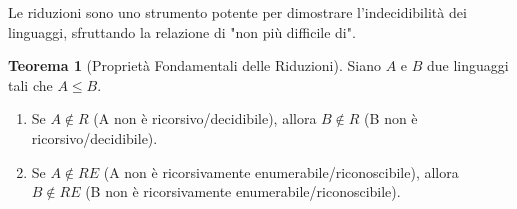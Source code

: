\documentclass[a4paper]{article}
\theoremstyle{definition} %
\newtheorem{theorem}{Teorema}
[section] %
\begin{document}
Le riduzioni sono uno strumento potente per dimostrare l'indecidibilità dei linguaggi, sfruttando la relazione di "non più difficile di".

\begin{theorem}[Proprietà Fondamentali delle Riduzioni]
Siano $A$ e $B$ due linguaggi tali che $A \le B$.
\begin{enumerate}
    \item Se $A \notin R$ (A non è ricorsivo/decidibile), allora $B \notin R$ (B non è ricorsivo/decidibile).
    \item Se $A \notin RE$ (A non è ricorsivamente enumerabile/riconoscibile), allora $B \notin RE$ (B non è ricorsivamente enumerabile/riconoscibile).
\end{enumerate}
\end{theorem}
\end{document}

